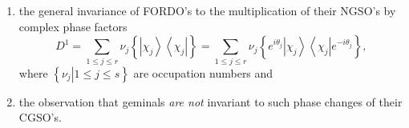 \documentclass[aps,preprint]{revtex4}%
\begin{document}
\begin{enumerate}
\item the general invariance of FORDO's to the multiplication of their NGSO's
by complex phase factors
\begin{equation}
D^{1}=\sum_{1\leq j\leq r}\nu_{j}\left\{  \left\vert \chi_{j}\right\rangle
\left\langle \chi_{j}\right\vert \right\}  =\sum_{1\leq j\leq r}\nu
_{j}\left\{  e^{i\theta_{j}}\left\vert \chi_{j}\right\rangle \left\langle
\chi_{j}\right\vert e^{-i\theta_{j}}\right\}  ,
\end{equation}
where $\left\{  \left.  \nu_{j}\right\vert 1\leq j\leq s\right\}  $ are
occupation numbers and

\item the observation that geminals \emph{are not }invariant to such phase
changes of their CGSO's.
\end{enumerate}
\end{document}
